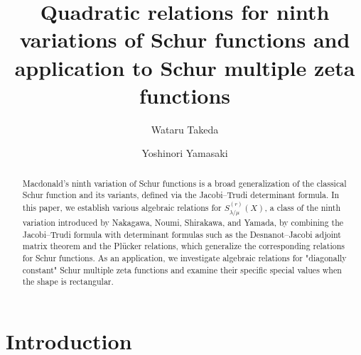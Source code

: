 \documentclass[12pt]{amsart}%
\newenvironment{nouppercase}{%
  \let\uppercase\relax%
  \renewcommand{\uppercasenonmath}[1]{}}{}
\theoremstyle{definition}
\begin{document}

\title{
Quadratic relations for ninth variations of Schur functions and \\ application to Schur multiple zeta functions
}
\author[W. Takeda]{Wataru Takeda}
\address{Wataru Takeda\\ Department of Mathematics, Toho University,
2-2-1, Miyama, Funabashi-shi, Chiba 274-8510, Japan.}
\author[Y. Yamasaki]{Yoshinori Yamasaki}
\address{Graduate School of Science and Engineering, Ehime University, 2-5, Bunkyo-cho, Matsuyama 790-8577, Japan}

\begin{nouppercase}
\maketitle
\end{nouppercase}
\begin{abstract}
Macdonald's ninth variation of Schur functions is a broad generalization of the classical Schur function and its variants, defined via the Jacobi–Trudi determinant formula.
In this paper, we establish various algebraic relations for $S^{(r)}_{\lambda/\mu}(X)$, a class of the ninth variation introduced by Nakagawa, Noumi, Shirakawa, and Yamada, by combining the Jacobi–Trudi formula with determinant formulas such as the Desnanot–Jacobi adjoint matrix theorem and the Pl\"ucker relations, which generalize the corresponding relations for Schur functions.
As an application, we investigate algebraic relations for "diagonally constant" Schur multiple zeta functions and examine their specific special values when the shape is rectangular.
\end{abstract}


\section{Introduction}
\end{document}
